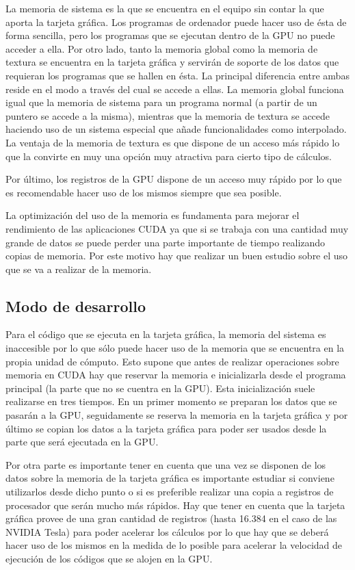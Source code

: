 La memoria de sistema es la que se encuentra en el equipo sin contar la que aporta la tarjeta gráfica. Los programas de ordenador puede hacer uso de ésta de forma sencilla, pero los programas que se ejecutan dentro de la GPU no puede acceder a ella. Por otro lado, tanto la memoria global como la memoria de textura se encuentra en la tarjeta gráfica y servirán de soporte de los datos que requieran los programas que se hallen en ésta. La principal diferencia entre ambas reside en el modo a través del cual se accede a ellas. La memoria global funciona igual que la memoria de sistema para un programa normal (a partir de un puntero se accede a la misma), mientras que la memoria de textura se accede haciendo uso de un sistema especial que añade funcionalidades como interpolado. La ventaja de la memoria de textura es que dispone de un acceso más rápido lo que la convirte en muy una opción muy atractiva para cierto tipo de cálculos.

Por último, los registros de la GPU dispone de un acceso muy rápido por lo que es recomendable hacer uso de los mismos siempre que sea posible.

La optimización del uso de la memoria es fundamenta para mejorar el rendimiento de las aplicaciones CUDA ya que si se trabaja con una cantidad muy grande de datos se puede perder una parte importante de tiempo realizando copias de memoria. Por este motivo hay que realizar un buen estudio sobre el uso que se va a realizar de la memoria.

\subsection{Modo de desarrollo}

Para el código que se ejecuta en la tarjeta gráfica, la memoria del sistema es inaccesible por lo que sólo puede hacer uso de la memoria que se encuentra en la propia unidad de cómputo. Esto supone que antes de realizar operaciones sobre memoria en CUDA hay que reservar la memoria e inicializarla desde el programa principal (la parte que no se cuentra en la GPU). Esta inicialización suele realizarse en tres tiempos. En un primer momento se preparan los datos que se pasarán a la GPU, seguidamente se reserva la memoria en la tarjeta gráfica y por último se copian los datos a la tarjeta gráfica para poder ser usados desde la parte que será ejecutada en la GPU.

Por otra parte es importante tener en cuenta que una vez se disponen de los datos sobre la memoria de la tarjeta gráfica es importante estudiar si conviene utilizarlos desde dicho punto o si es preferible realizar una copia a registros de procesador que serán mucho más rápidos. Hay que tener en cuenta que la tarjeta gráfica provee de una gran cantidad de registros (hasta 16.384 en el caso de las NVIDIA Tesla) para poder acelerar los cálculos por lo que hay que se deberá hacer uso de los mismos en la medida de lo posible para acelerar la velocidad de ejecución de los códigos que se alojen en la GPU.

